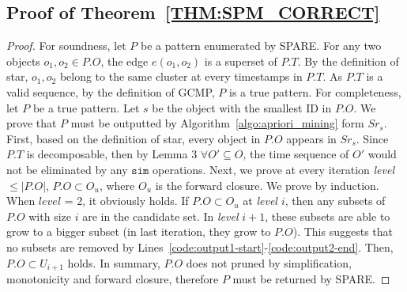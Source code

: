 \subsection{Proof of Theorem~\ref{THM:SPM_CORRECT}}
\label{apx:spm_correct}
\begin{proof}
For soundness, let $P$ be a pattern enumerated by SPARE. For any two objects $o_1, o_2 \in P.O$, the edge $e(o_1,o_2)$ is a superset of $P.T$. By the definition of star, $o_1,o_2$ belong to the same cluster at every timestamps in $P.T$. As $P.T$ is a valid sequence, by the definition of GCMP, $P$ is a true pattern.
For completeness, let $P$ be a true pattern. Let $s$ be the object with the smallest ID in $P.O$. We prove that $P$ must be outputted by Algorithm~\ref{algo:apriori_mining} form $Sr_s$. 
First, based on the definition of star, every object in $P.O$ appears in $Sr_s$. Since $P.T$ is decomposable, then by Lemma 3 $\forall O' \subseteq O$, the time sequence of $O'$ would not be eliminated by any $\mathtt{sim}$ operations.  Next, we prove at every iteration \emph{level} $\leq |P.O|$, $P.O \subset O_u$, where $O_u$ is the forward closure. We prove by induction. When $level$ = 2, it obviously holds. If $P.O \subset O_u$ at \emph{level $i$}, then any subsets of $P.O$ with size $i$ are in the candidate set. In \emph{level} $i+1$, these subsets are able to grow to a bigger subset (in last iteration, they grow to $P.O$). This suggests that no subsets are removed by Lines~\ref{code:output1-start}-\ref{code:output2-end}. Then, $P.O \subset U_{i+1}$ holds. In summary, $P.O$ does not pruned by simplification, monotonicity and forward closure, therefore $P$ must be returned by SPARE.
\end{proof}

